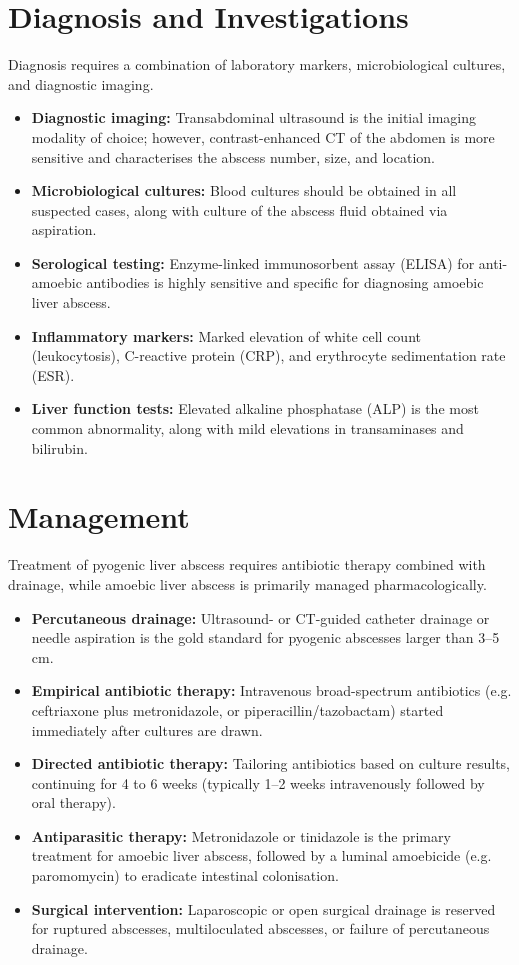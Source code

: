 \section*{Diagnosis and Investigations}
Diagnosis requires a combination of laboratory markers, microbiological cultures, and diagnostic imaging.
\begin{itemize}
    \item \textbf{Diagnostic imaging:} Transabdominal ultrasound is the initial imaging modality of choice; however, contrast-enhanced CT of the abdomen is more sensitive and characterises the abscess number, size, and location.
    \item \textbf{Microbiological cultures:} Blood cultures should be obtained in all suspected cases, along with culture of the abscess fluid obtained via aspiration.
    \item \textbf{Serological testing:} Enzyme-linked immunosorbent assay (ELISA) for anti-amoebic antibodies is highly sensitive and specific for diagnosing amoebic liver abscess.
    \item \textbf{Inflammatory markers:} Marked elevation of white cell count (leukocytosis), C-reactive protein (CRP), and erythrocyte sedimentation rate (ESR).
    \item \textbf{Liver function tests:} Elevated alkaline phosphatase (ALP) is the most common abnormality, along with mild elevations in transaminases and bilirubin.
\end{itemize}

\section*{Management}
Treatment of pyogenic liver abscess requires antibiotic therapy combined with drainage, while amoebic liver abscess is primarily managed pharmacologically.
\begin{itemize}
    \item \textbf{Percutaneous drainage:} Ultrasound- or CT-guided catheter drainage or needle aspiration is the gold standard for pyogenic abscesses larger than 3--5 cm.
    \item \textbf{Empirical antibiotic therapy:} Intravenous broad-spectrum antibiotics (e.g. ceftriaxone plus metronidazole, or piperacillin/tazobactam) started immediately after cultures are drawn.
    \item \textbf{Directed antibiotic therapy:} Tailoring antibiotics based on culture results, continuing for 4 to 6 weeks (typically 1--2 weeks intravenously followed by oral therapy).
    \item \textbf{Antiparasitic therapy:} Metronidazole or tinidazole is the primary treatment for amoebic liver abscess, followed by a luminal amoebicide (e.g. paromomycin) to eradicate intestinal colonisation.
    \item \textbf{Surgical intervention:} Laparoscopic or open surgical drainage is reserved for ruptured abscesses, multiloculated abscesses, or failure of percutaneous drainage.
\end{itemize}

